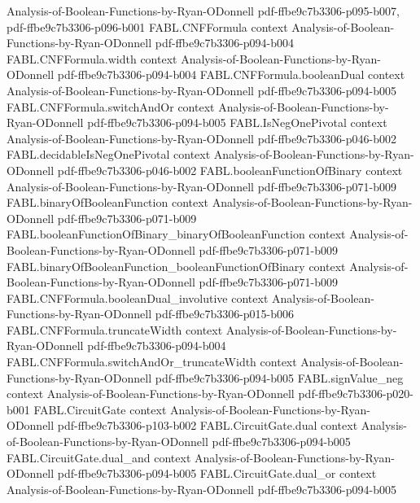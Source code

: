 \begin{theorem}
  {Analysis-of-Boolean-Functions-by-Ryan-ODonnell}
  {pdf-ffbe9c7b3306-p095-b007,
    pdf-ffbe9c7b3306-p096-b001}
\proofstep
  {FABL.CNFFormula}
  {context}
  {Analysis-of-Boolean-Functions-by-Ryan-ODonnell}
  {pdf-ffbe9c7b3306-p094-b004}
\proofstep
  {FABL.CNFFormula.width}
  {context}
  {Analysis-of-Boolean-Functions-by-Ryan-ODonnell}
  {pdf-ffbe9c7b3306-p094-b004}
\proofstep
  {FABL.CNFFormula.booleanDual}
  {context}
  {Analysis-of-Boolean-Functions-by-Ryan-ODonnell}
  {pdf-ffbe9c7b3306-p094-b005}
\proofstep
  {FABL.CNFFormula.switchAndOr}
  {context}
  {Analysis-of-Boolean-Functions-by-Ryan-ODonnell}
  {pdf-ffbe9c7b3306-p094-b005}
\proofstep
  {FABL.IsNegOnePivotal}
  {context}
  {Analysis-of-Boolean-Functions-by-Ryan-ODonnell}
  {pdf-ffbe9c7b3306-p046-b002}
\proofstep
  {FABL.decidableIsNegOnePivotal}
  {context}
  {Analysis-of-Boolean-Functions-by-Ryan-ODonnell}
  {pdf-ffbe9c7b3306-p046-b002}
\proofstep
  {FABL.booleanFunctionOfBinary}
  {context}
  {Analysis-of-Boolean-Functions-by-Ryan-ODonnell}
  {pdf-ffbe9c7b3306-p071-b009}
\proofstep
  {FABL.binaryOfBooleanFunction}
  {context}
  {Analysis-of-Boolean-Functions-by-Ryan-ODonnell}
  {pdf-ffbe9c7b3306-p071-b009}
\proofstep
  {FABL.booleanFunctionOfBinary_binaryOfBooleanFunction}
  {context}
  {Analysis-of-Boolean-Functions-by-Ryan-ODonnell}
  {pdf-ffbe9c7b3306-p071-b009}
\proofstep
  {FABL.binaryOfBooleanFunction_booleanFunctionOfBinary}
  {context}
  {Analysis-of-Boolean-Functions-by-Ryan-ODonnell}
  {pdf-ffbe9c7b3306-p071-b009}
\proofstep
  {FABL.CNFFormula.booleanDual_involutive}
  {context}
  {Analysis-of-Boolean-Functions-by-Ryan-ODonnell}
  {pdf-ffbe9c7b3306-p015-b006}
\proofstep
  {FABL.CNFFormula.truncateWidth}
  {context}
  {Analysis-of-Boolean-Functions-by-Ryan-ODonnell}
  {pdf-ffbe9c7b3306-p094-b004}
\proofstep
  {FABL.CNFFormula.switchAndOr_truncateWidth}
  {context}
  {Analysis-of-Boolean-Functions-by-Ryan-ODonnell}
  {pdf-ffbe9c7b3306-p094-b005}
\proofstep
  {FABL.signValue_neg}
  {context}
  {Analysis-of-Boolean-Functions-by-Ryan-ODonnell}
  {pdf-ffbe9c7b3306-p020-b001}
\proofstep
  {FABL.CircuitGate}
  {context}
  {Analysis-of-Boolean-Functions-by-Ryan-ODonnell}
  {pdf-ffbe9c7b3306-p103-b002}
\proofstep
  {FABL.CircuitGate.dual}
  {context}
  {Analysis-of-Boolean-Functions-by-Ryan-ODonnell}
  {pdf-ffbe9c7b3306-p094-b005}
\proofstep
  {FABL.CircuitGate.dual_and}
  {context}
  {Analysis-of-Boolean-Functions-by-Ryan-ODonnell}
  {pdf-ffbe9c7b3306-p094-b005}
\proofstep
  {FABL.CircuitGate.dual_or}
  {context}
  {Analysis-of-Boolean-Functions-by-Ryan-ODonnell}
  {pdf-ffbe9c7b3306-p094-b005}

\end{theorem}
